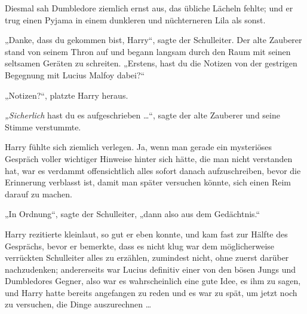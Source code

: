 Diesmal sah Dumbledore ziemlich ernst aus, das übliche Lächeln fehlte; und er trug einen Pyjama in einem dunkleren und nüchterneren Lila als sonst.

„Danke, dass du gekommen bist, Harry“, sagte der Schulleiter. Der alte Zauberer stand von seinem Thron auf und begann langsam durch den Raum mit seinen seltsamen Geräten zu schreiten.
„Erstens, hast du die Notizen von der gestrigen Begegnung mit Lucius Malfoy dabei?“

„Notizen?“, platzte Harry heraus.

\emph{„Sicherlich} hast du es aufgeschrieben …“, sagte der alte Zauberer und seine Stimme verstummte.

Harry fühlte sich ziemlich verlegen. Ja, wenn man gerade ein mysteriöses Gespräch voller wichtiger Hinweise hinter sich hätte, die man nicht verstanden hat, war es verdammt offensichtlich alles sofort danach aufzuschreiben, bevor die Erinnerung verblasst ist, damit man später versuchen könnte, sich einen Reim darauf zu machen.

„In Ordnung“, sagte der Schulleiter, „dann also aus dem Gedächtnis.“

Harry rezitierte kleinlaut, so gut er eben konnte, und kam fast zur Hälfte des Gesprächs, bevor er bemerkte, dass es nicht klug war dem möglicherweise verrückten Schulleiter alles zu erzählen, zumindest nicht, ohne zuerst darüber nachzudenken; andererseits war Lucius definitiv einer von den bösen Jungs und Dumbledores Gegner, also war es wahrscheinlich eine gute Idee, es ihm zu sagen, und Harry hatte bereits angefangen zu reden und es war zu spät, um jetzt noch zu versuchen, die Dinge auszurechnen …

